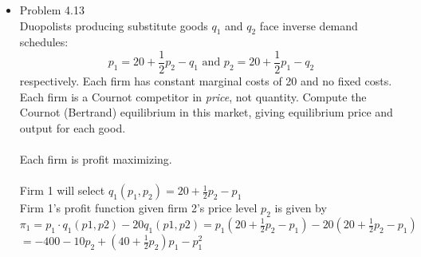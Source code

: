 \documentclass{article}
\begin{document}
\begin{itemize}
    (c) Given your answers in parts (a) and (b), who would firm 1 want to be the leader in the market?  Who would firm 2 want to be the leader?\\\\
    Each firm would prefer that they are themselves the leader in the market as the first to move has an advantage in this game.\\\\
    (d) If each firm assumes what it wants to be the case in part (c), what are the equilibrium market price and firm profits?\\\\
    This would then reduce to a case of Cournot competition, each firm is still profit maximizing\\\\
    From parts (a) and (b), we have the profit maximizing first order condition for firms 1 and 2 given by\\
    $90-q_2-2q_1=0$\\
    $100-q_1-4q_2=0$\\
    And our Nash Equilibrium given by their solution as\\
    $\Rightarrow\bar{q}_1=\dfrac{260}{7}$ $\Rightarrow\bar{q}_2=\dfrac{110}{7}$\\\\
    $\Rightarrow \bar{\pi}_1=\dfrac{67600}{49}\sim1379.59$ $\Rightarrow \bar{\pi}_2=\dfrac{28600}{49}\sim583.67$
    \pagebreak
    \item Problem 4.13\\
    Duopolists producing substitute goods $q_1$ and $q_2$ face inverse demand schedules:
    $$p_1=20+\dfrac{1}{2}p_2-q_1\text{ and }p_2=20+\dfrac{1}{2}p_1-q_2$$
    respectively.  Each firm has constant marginal costs of 20 and no fixed costs.  Each firm is a Cournot competitor in \emph{price}, not quantity.  Compute the Cournot (Bertrand) equilibrium in this market, giving equilibrium price and output for each good.\\\\ 
    Each firm is profit maximizing.\\\\
    Firm 1 will select $q_1(p_1,p_2)=20+\frac{1}{2}p_2-p_1$\\
    Firm 1's profit function given firm 2's price level $p_2$ is given by\\
    $\pi_1=p_1\cdot q_1(p1,p2)-20q_1(p1,p2)=p_1(20+\frac{1}{2}p_2-p_1)-20(20+\frac{1}{2}p_2-p_1)$\\
    $=-400-10p_2+(40+\frac{1}{2}p_2)p_1-p_1^2$\\

\end{itemize}
\end{document}
